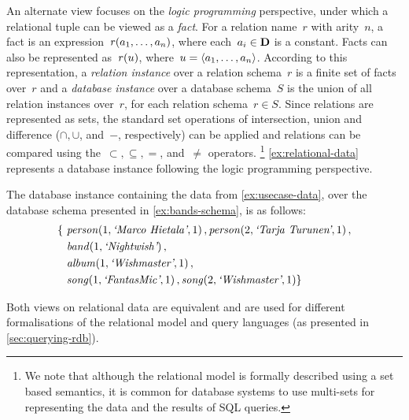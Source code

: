 %
An alternate view focuses on the \emph{logic programming} perspective, under which a relational tuple can be viewed as a
\emph{fact}.  For a relation name~$r$ with arity~$n$, a fact is an expression~$\mathit{r}\!\left(a_{1}, \dots, a_{n}\right)$, where
each~$a_{i} \in \mathbf{D}$ is a constant.  Facts can also be represented as~$\mathit{r}\!\left(u\right)$, where~$u = \langle a_{1}, \dots,
  a_{n} \rangle$.
%
According to this representation, a \emph{relation instance} over a relation schema~$r$ is a finite set of facts
over~$r$ and a \emph{database instance} over a database schema~$S$ is the union of all relation instances over~$r$, for
each relation schema~$r \in S$.
%
Since relations are represented as sets, the standard set operations of intersection, union and difference ($\cap,
\cup$, and~$-$, respectively) can be applied and relations can be compared using the~$\subset, \subseteq, =$, and~$\neq$
operators.
%
\footnote{We note that although the relational model is formally described using a set based semantics, it is common for
  database systems to use multi-sets for representing the data and the results of \acs{SQL} queries.}
%
\cref{ex:relational-data} represents a database instance following the logic programming perspective.
%
\begin{example}
  \label{ex:relational-data}
  The database instance containing the \usecase data from \cref{ex:usecase-data}, over the database schema
  presented in \cref{ex:bands-schema}, is as follows:
  \pagebreak[2]
  \begin{align*}
    \{\ 
        & \fact{person}{1, \atom{Marco Hietala}, 1}, \fact{person}{2, \atom{Tarja Turunen}, 1}, \\
        & \fact{band}{1, \atom{Nightwish}}, \\
        & \fact{album}{1, \atom{Wishmaster}, 1}, \\
        & \fact{song}{1,\atom{FantasMic}, 1}, \fact{song}{2, \atom{Wishmaster}, 1} 
        \}
  \end{align*}
\end{example}
%
Both views on relational data are equivalent and are used for different formalisations of the relational model and query
languages (as presented in \cref{sec:querying-rdb}).









